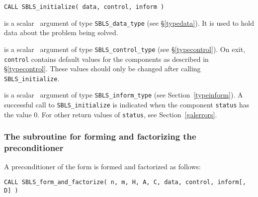 \documentclass{galahad}
\newcommand{\packagename}{SBLS}
\begin{document}
\hspace{8mm}
{\tt CALL \packagename\_initialize( data, control, inform )}

\vspace*{-3mm}
\begin{description}

 is a scalar \intentinout\ argument of type
{\tt \packagename\_data\_type}
(see \S\ref{typedata}). It is used to hold data about the problem being
solved.

 is a scalar \intentout\ argument of type
{\tt \packagename\_control\_type}
(see \S\ref{typecontrol}).
On exit, {\tt control} contains default values for the components as
described in \S\ref{typecontrol}.
These values should only be changed after calling
{\tt \packagename\_initialize}.

 is a scalar \intentout\ argument of type
{\tt \packagename\_inform\_type}
(see Section~\ref{typeinform}). A successful call to
{\tt \packagename\_initialize}
is indicated when the  component {\tt status} has the value 0.
For other return values of {\tt status}, see Section~\ref{galerrors}.

\end{description}


\subsubsection{The subroutine for forming and factorizing the preconditioner}
A preconditioner of the form  is formed and factorized as follows:
\vspace*{1mm}

\hspace{8mm}
{\tt CALL \packagename\_form\_and\_factorize( n, m, H, A, C, data, control, inform[, D] )}
\end{document}

